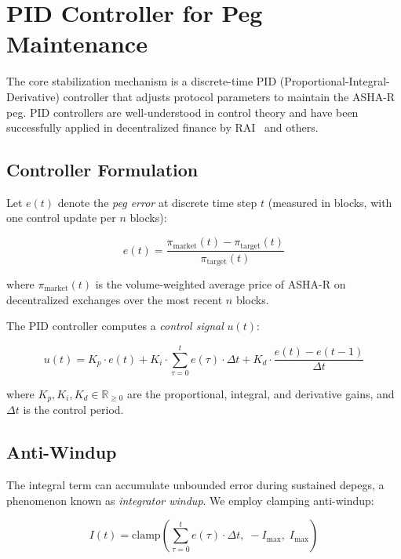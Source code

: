 \documentclass[11pt,a4paper]{article}
\newcommand{\ashares}{\textsc{ASHA-R}\xspace}
\newcommand{\RR}{\mathbb{R}}
\begin{document}
\section{PID Controller for Peg Maintenance}
\label{sec:pid}

The core stabilization mechanism is a discrete-time PID (Proportional-Integral-Derivative) controller that adjusts protocol parameters to maintain the \ashares peg.
PID controllers are well-understood in control theory and have been successfully applied in decentralized finance by RAI~\citep{rai2021} and others.

\subsection{Controller Formulation}

Let $e(t)$ denote the \emph{peg error} at discrete time step $t$ (measured in blocks, with one control update per $n$ blocks):

\begin{equation}
  e(t) = \frac{\pi_{\text{market}}(t) - \pi_{\text{target}}(t)}{\pi_{\text{target}}(t)}
\end{equation}

where $\pi_{\text{market}}(t)$ is the volume-weighted average price of \ashares on decentralized exchanges over the most recent $n$ blocks.

The PID controller computes a \emph{control signal} $u(t)$:

\begin{equation}
  u(t) = K_p \cdot e(t) + K_i \cdot \sum_{\tau=0}^{t} e(\tau) \cdot \Delta t + K_d \cdot \frac{e(t) - e(t-1)}{\Delta t}
  \label{eq:pid}
\end{equation}

where $K_p, K_i, K_d \in \RR_{\geq 0}$ are the proportional, integral, and derivative gains, and $\Delta t$ is the control period.

\subsection{Anti-Windup}

The integral term can accumulate unbounded error during sustained depegs, a phenomenon known as \emph{integrator windup}.
We employ clamping anti-windup:

\begin{equation}
  I(t) = \text{clamp}\left(\sum_{\tau=0}^{t} e(\tau) \cdot \Delta t,\; -I_{\max},\; I_{\max}\right)
\end{equation}
\end{document}
